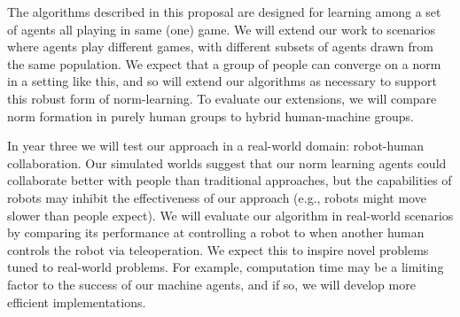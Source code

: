 The algorithms described in this proposal are designed for learning
among a set of agents all playing in same (one) game. We will extend
our work to scenarios where agents play different games, with
different subsets of agents drawn from the same population. We expect
that a group of people can converge on a norm in a setting like this,
and so will extend our algorithms as necessary to support this robust
form of norm-learning. To evaluate our extensions, we will compare
norm formation in purely human groups to hybrid human-machine groups.

In year three we will test our approach in a real-world domain:
robot-human collaboration. Our simulated worlds suggest that our norm
learning agents could collaborate better with people than traditional
approaches, but the capabilities of robots may inhibit the
effectiveness of our approach (e.g., robots might move slower than
people expect). We will evaluate our algorithm in real-world scenarios
by comparing its performance at controlling a robot to when another
human controls the robot via teleoperation. We expect this to inspire
novel problems tuned to real-world problems. For example, computation
time may be a limiting factor to the success of our machine agents,
and if so, we will develop more efficient implementations.

